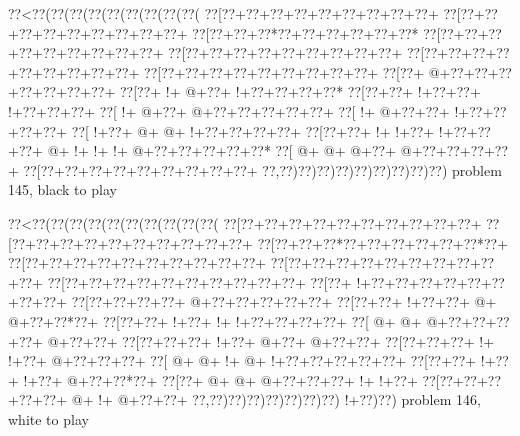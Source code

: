 \vbox{\vbox{\goo
\0??<\0??(\0??(\0??(\0??(\0??(\0??(\0??(\0??(\0??(
\0??[\0??+\0??+\0??+\0??+\0??+\0??+\0??+\0??+\0??+
\0??[\0??+\0??+\0??+\0??+\0??+\0??+\0??+\0??+\0??+
\0??[\0??+\0??+\0??*\0??+\0??+\0??+\0??+\0??+\0??*
\0??[\0??+\0??+\0??+\0??+\0??+\0??+\0??+\0??+\0??+
\0??[\0??+\0??+\0??+\0??+\0??+\0??+\0??+\0??+\0??+
\0??[\0??+\0??+\0??+\0??+\0??+\0??+\0??+\0??+\0??+
\0??[\0??+\0??+\0??+\0??+\0??+\0??+\0??+\0??+\0??+
\0??[\0??+\- @+\0??+\0??+\0??+\0??+\0??+\0??+\0??+
\0??[\0??+\- !+\- @+\0??+\- !+\0??+\0??+\0??+\0??*
\0??[\0??+\0??+\- !+\0??+\0??+\- !+\0??+\0??+\0??+
\0??[\- !+\- @+\0??+\- @+\0??+\0??+\0??+\0??+\0??+
\0??[\- !+\- @+\0??+\0??+\- !+\0??+\0??+\0??+\0??+
\0??[\- !+\0??+\- @+\- @+\- !+\0??+\0??+\0??+\0??+
\0??[\0??+\0??+\- !+\- !+\0??+\- !+\0??+\0??+\0??+
\- @+\- !+\- !+\- !+\- @+\0??+\0??+\0??+\0??+\0??*
\0??[\- @+\- @+\- @+\0??+\- @+\0??+\0??+\0??+\0??+
\0??[\0??+\0??+\0??+\0??+\0??+\0??+\0??+\0??+\0??+
\0??,\0??)\0??)\0??)\0??)\0??)\0??)\0??)\0??)\0??)
}
\hfil problem 145, black to play\hfil\break
}

\vbox{\vbox{\goo
\0??<\0??(\0??(\0??(\0??(\0??(\0??(\0??(\0??(\0??(\0??(
\0??[\0??+\0??+\0??+\0??+\0??+\0??+\0??+\0??+\0??+\0??+
\0??[\0??+\0??+\0??+\0??+\0??+\0??+\0??+\0??+\0??+\0??+
\0??[\0??+\0??+\0??*\0??+\0??+\0??+\0??+\0??+\0??*\0??+
\0??[\0??+\0??+\0??+\0??+\0??+\0??+\0??+\0??+\0??+\0??+
\0??[\0??+\0??+\0??+\0??+\0??+\0??+\0??+\0??+\0??+\0??+
\0??[\0??+\0??+\0??+\0??+\0??+\0??+\0??+\0??+\0??+\0??+
\0??[\0??+\- !+\0??+\0??+\0??+\0??+\0??+\0??+\0??+\0??+
\0??[\0??+\0??+\0??+\0??+\- @+\0??+\0??+\0??+\0??+\0??+
\0??[\0??+\0??+\- !+\0??+\0??+\- @+\- @+\0??+\0??*\0??+
\0??[\0??+\0??+\- !+\0??+\- !+\- !+\0??+\0??+\0??+\0??+
\0??[\- @+\- @+\- @+\0??+\0??+\0??+\0??+\- @+\0??+\0??+
\0??[\0??+\0??+\0??+\- !+\0??+\- @+\0??+\- @+\0??+\0??+
\0??[\0??+\0??+\0??+\- !+\- !+\0??+\- @+\0??+\0??+\0??+
\0??[\- @+\- @+\- !+\- @+\- !+\0??+\0??+\0??+\0??+\0??+
\0??[\0??+\0??+\- !+\0??+\- !+\0??+\- @+\0??+\0??*\0??+
\0??[\0??+\- @+\- @+\- @+\0??+\0??+\0??+\- !+\- !+\0??+
\0??[\0??+\0??+\0??+\0??+\0??+\- @+\- !+\- @+\0??+\0??+
\0??,\0??)\0??)\0??)\0??)\0??)\0??)\0??)\- !+\0??)\0??)
}
\hfil problem 146, white to play\hfil\break
}

